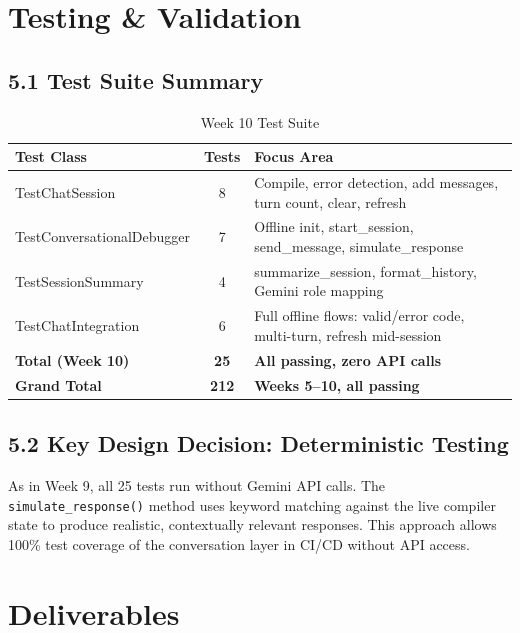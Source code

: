 \documentclass[a4paper,11pt]{article}
\begin{document}
\section{Testing \& Validation}

\subsection{5.1 Test Suite Summary}

\begin{table}[h]
\centering
\begin{tabularx}{\textwidth}{|l|c|X|}
\hline
\rowcolor{blue!10}
\textbf{Test Class} & \textbf{Tests} & \textbf{Focus Area} \\
\hline
TestChatSession & 8 & Compile, error detection, add messages, turn count, clear, refresh \\
\hline
TestConversationalDebugger & 7 & Offline init, start\_session, send\_message, simulate\_response \\
\hline
TestSessionSummary & 4 & summarize\_session, format\_history, Gemini role mapping \\
\hline
TestChatIntegration & 6 & Full offline flows: valid/error code, multi-turn, refresh mid-session \\
\hline
\textbf{Total (Week 10)} & \textbf{25} & \textbf{All passing, zero API calls} \\
\hline
\textbf{Grand Total} & \textbf{212} & \textbf{Weeks 5--10, all passing} \\
\hline
\end{tabularx}
\caption{Week 10 Test Suite}
\end{table}

\subsection{5.2 Key Design Decision: Deterministic Testing}

As in Week 9, all 25 tests run without Gemini API calls. The \texttt{simulate\_response()} method uses keyword matching against the live compiler state to produce realistic, contextually relevant responses. This approach allows 100\% test coverage of the conversation layer in CI/CD without API access.

\section{Deliverables}
\end{document}
